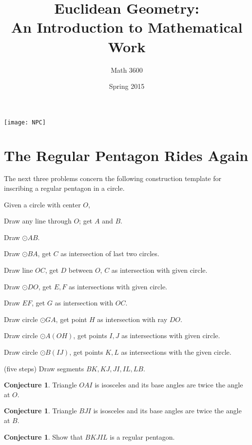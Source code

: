 \documentclass{tufte-handout}
\title{Euclidean Geometry:\\An Introduction to Mathematical Work}
\author[]{Math 3600}
\date{Spring 2015}
\theoremstyle{definition}
\newtheorem{conjecture}[problem]{Conjecture}
\begin{document}
\maketitle

\begin{marginfigure}
    \texttt{[image: NPC]}
\end{marginfigure}

\setcounter{section}{16}
\section{The Regular Pentagon Rides Again}


The next three problems concern the following construction template for inscribing a regular pentagon in a circle. 

\vspace{.5in}

Given a circle with center $O$,
\begin{compactenum}
\item Draw any line through $O$; get $A$ and $B$.
\item Draw $\odot AB$.
\item Draw $\odot BA$, get $C$ as intersection of last two circles.
\item Draw line $OC$, get $D$ between $O$, $C$ as intersection with given circle.
\item Draw $\odot DO$, get $E, F$ as intersections with given circle.
\item Draw $EF$, get $G$ as intersection with $OC$.
\item Draw circle $\odot GA$, get point $H$ as intersection with ray $DO$.
\item Draw circle $\odot A(OH)$, get points $I, J$ as intersections with given circle.
\item Draw circle $\odot B(IJ)$, get points $K, L$ as intersections with the given circle.
\item (five steps) Draw segments $BK, KJ, JI, IL, LB$.
\end{compactenum}

\vspace{.5in}

\begin{conjecture}\label{conj:pentagon-1}
Triangle $OAI$ is isosceles and its base angles are twice the angle at $O$.
\end{conjecture}

\begin{conjecture}\label{conj:pentagon-2}
Triangle $BJI$ is isosceles and its base angles are twice the angle at $B$.
\end{conjecture}

\begin{conjecture}\label{conj:pentagon-3}
Show that $BKJIL$ is a regular pentagon.
\end{conjecture}

\vfill
\end{document}
